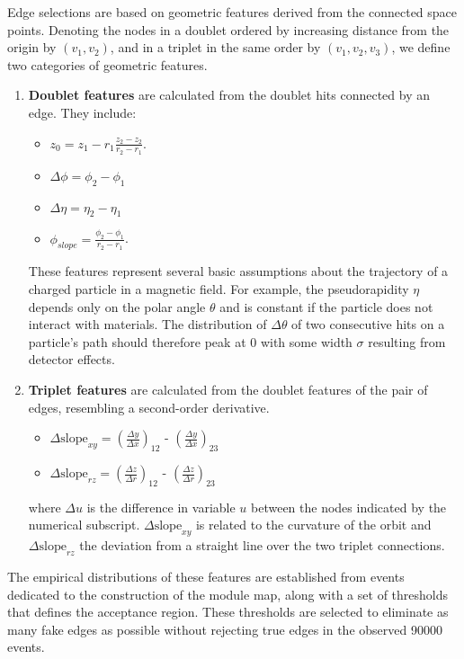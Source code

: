 Edge selections are based on geometric features derived from the connected space points. 
Denoting the nodes in a doublet ordered by increasing distance from the origin by $(v_1, v_2)$, and in a triplet in the same order by $(v_1, v_2, v_3)$, we define two categories of geometric features.
\begin{enumerate}
    \item \textbf{Doublet features} are calculated from the doublet hits connected by an edge. They include:
    \begin{itemize}
        \item $z_0 = z_1-r_1\frac{z_2-z_2}{r_2-r_1}$.
        \item $\Delta\phi=\phi_2-\phi_1$
        \item $\Delta\eta = \eta_2-\eta_1$
        \item $\phi_{slope}=\frac{\phi_2-\phi_1}{r_2-r_1}$.
    \end{itemize}
    These features represent several basic assumptions about the trajectory of a charged particle in a magnetic field. 
    For example, the pseudorapidity $\eta$ depends only on the polar angle $\theta$ and is constant if the particle does not interact with materials. 
    The distribution of $\Delta \theta$ of two consecutive hits on a particle's path should therefore peak at $0$ with some width $\sigma$ resulting from detector effects. 
    \item \textbf{Triplet features} are calculated from the doublet features of the pair of edges, resembling a second-order derivative. 
    \begin{itemize}
        \item $\Delta\mathrm{slope}_{xy} = \left(\frac{\Delta y}{\Delta x}\right)_{12}$ - $\left(\frac{\Delta y}{\Delta x}\right)_{23}$
        \item $\Delta\mathrm{slope}_{rz} = \left(\frac{\Delta z}{\Delta r}\right)_{12}$ - $\left(\frac{\Delta z}{\Delta r}\right)_{23}$
    \end{itemize}
    where $\Delta u$ is the difference in variable $u$ between the nodes indicated by the numerical subscript. $\Delta\mathrm{slope}_{xy}$ is related to the curvature of the orbit and $\Delta\mathrm{slope}_{rz}$ the deviation from a straight line over the two triplet connections.
\end{enumerate}
The empirical distributions of these features are established from events dedicated to the construction of the module map, along with a set of thresholds that defines the acceptance region. 
These thresholds are selected to eliminate as many fake edges as possible without rejecting true edges in the observed 90000 events. 
